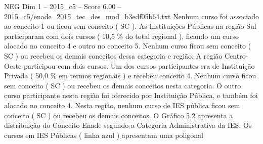 \begin{textsample}{NEG Dim 1 – 2015\_c5 – Score 6.00 – 2015\_c5/enade\_2015\_tec\_des\_mod\_b3edf05b64.txt}
Nenhum curso foi associado ao conceito 1 ou ficou sem conceito ( SC ).
As Instituições Públicas na região Sul participaram com dois cursos ( 10,5 \% do total regional ), ficando um curso alocado no conceito 4 e outro no conceito 5.
Nenhum curso ficou sem conceito ( SC ) ou recebeu os demais conceitos dessa categoria e região.
A região Centro-Oeste participou com dois cursos.
Um dos cursos participantes era de Instituição Privada ( 50,0 \% em termos regionais ) e recebeu conceito 4.
Nenhum curso ficou sem conceito ( SC ) ou recebeu os demais conceitos nesta categoria.
O outro curso participante nesta região foi oferecido por Instituição Pública, e também foi alocado no conceito 4.
Nesta região, nenhum curso de IES pública ficou sem conceito ( SC ) ou recebeu os demais conceitos.
O Gráfico 5.2 apresenta a distribuição do Conceito Enade segundo a Categoria Administrativa da IES.
Os cursos em IES Públicas ( linha azul ) apresentam uma poligonal

\end{textsample}

